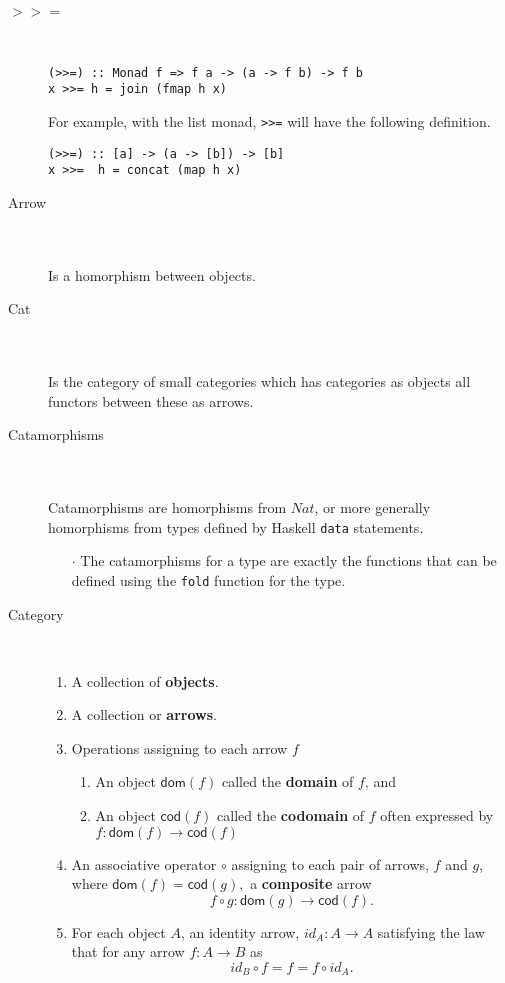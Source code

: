 \documentclass[10pt]{article}
\newcommand{\imp}{\textbf}
\newcommand{\dom}[1]{\textsf{dom} (#1)}
\newcommand{\cod}[1]{\textsf{cod}(#1)}
\newcommand{\state}[1]{\item[#1] \textcolor{white}{.} \\ \textcolor{white}{.} \\ }
\newcommand{\Lstate}[1]{\item[#1] \nl}
\newcommand{\nl}{\textcolor{white}{.}\ }
\newcommand{\func}[3]{#1 : #2 \rightarrow #3}
\newcommand{\point}[1]{\begin{itemize} \item[$\cdot$] #1 \end{itemize}}
\begin{document}
 

\begin{description}

\Lstate{$>>=$}
\begin{verbatim}
(>>=) :: Monad f => f a -> (a -> f b) -> f b
x >>= h = join (fmap h x)
\end{verbatim}
For example, with the list monad, \texttt{>>=} will have the following definition.
\begin{verbatim}
(>>=) :: [a] -> (a -> [b]) -> [b]
x >>=  h = concat (map h x)
\end{verbatim}

\state{Arrow}
Is a homorphism between objects.

\state{Cat} Is the category of small categories which has categories as objects all functors between these as arrows.

\state{Catamorphisms}
Catamorphisms are homorphisms from $Nat$, or more generally homorphisms from types defined by Haskell \texttt{data} statements.

\point{The catamorphisms for a type are exactly the functions that can be defined using the \texttt{fold} function for the type.}

\item[Category] \textcolor{white}{.}

\begin{enumerate}
\item A collection of \imp{objects}.
\item A collection or \imp{arrows}.
\item Operations assigning to each arrow $f$

\begin{enumerate}
\item An object $\dom{f}$ called the \imp{domain} of $f$, and
\item An object $\cod{f}$ called the \imp{codomain} of $f$ often expressed by $f : \dom{f} \rightarrow \cod{f}$
\end{enumerate}

\item An associative operator $\circ$ assigning to each pair of arrows, $f$ and $g$, where $\dom{f}=\cod{g},$ a \imp{composite} arrow $$f \circ g : \dom{g} \rightarrow \cod{f}.$$

\item For each object $A$, an identity arrow, $\func{id_A}{A}{A}$ satisfying the law that for any arrow $\func{f}{A}{B}$ as $${id_B \circ f}={f}={f \circ id_A}.$$
\end{enumerate}


\end{description}
\end{document}
